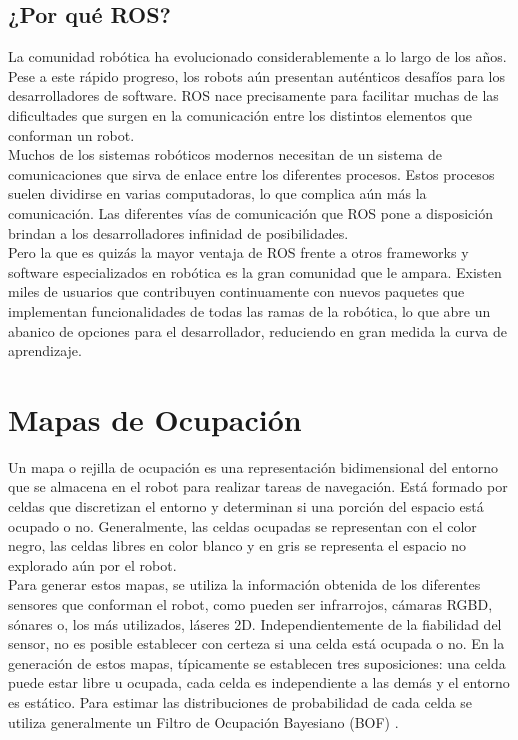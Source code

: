 \subsection{¿Por qué ROS?}

La comunidad robótica ha evolucionado considerablemente a lo largo de los años. Pese a  este rápido progreso, los robots aún presentan auténticos desafíos para los desarrolladores de software. ROS nace precisamente para facilitar muchas de las dificultades que surgen en la comunicación entre los distintos elementos que conforman un robot.\\

Muchos de los sistemas robóticos modernos necesitan de un sistema de comunicaciones que sirva de enlace entre los diferentes procesos. Estos procesos suelen dividirse en varias computadoras, lo que complica aún más la comunicación. Las diferentes vías de comunicación que ROS pone a disposición brindan a los desarrolladores infinidad de posibilidades.\\

Pero la que es quizás la mayor ventaja de ROS frente a otros frameworks y software especializados en robótica es la gran comunidad que le ampara. Existen miles de usuarios que contribuyen continuamente con nuevos paquetes que implementan funcionalidades de todas las ramas de la robótica, lo que abre un abanico de opciones para el desarrollador, reduciendo en gran medida la curva de aprendizaje.\\

\section{Mapas de Ocupación}

Un mapa o rejilla de ocupación es una representación bidimensional del entorno que se almacena en el robot para realizar tareas de navegación. Está formado por celdas que discretizan el entorno y determinan si una porción del espacio está ocupado o no. Generalmente, las celdas ocupadas se representan con el color negro, las celdas libres en color blanco y en gris se representa el espacio no explorado aún por el robot.\\

Para generar estos mapas, se utiliza la información obtenida de los diferentes sensores que conforman el robot, como pueden ser infrarrojos, cámaras RGBD, sónares o, los más utilizados, láseres 2D. Independientemente de la fiabilidad del sensor, no es posible establecer con certeza si una celda está ocupada o no. En la generación de estos mapas, típicamente se establecen tres suposiciones: una celda puede estar libre u ocupada, cada celda es independiente a las demás y el entorno es estático. Para estimar las distribuciones de probabilidad de cada celda se utiliza generalmente un Filtro de Ocupación Bayesiano (BOF) \cite{occupancy_grid}.\\


